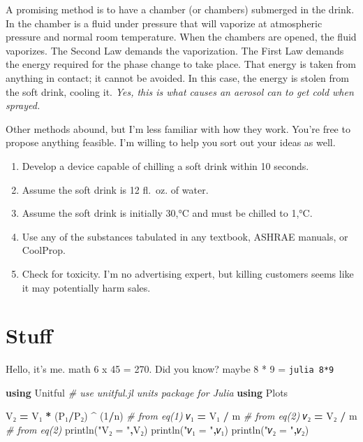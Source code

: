 \documentclass[
]{book}
\newenvironment{Shaded}{\begin{snugshade}}{\end{snugshade}}
\newcommand{\CommentTok}[1]{\textcolor[rgb]{0.56,0.35,0.01}{\textit{#1}}}
\newcommand{\FloatTok}[1]{\textcolor[rgb]{0.00,0.00,0.81}{#1}}
\newcommand{\KeywordTok}[1]{\textcolor[rgb]{0.13,0.29,0.53}{\textbf{#1}}}
\newcommand{\NormalTok}[1]{#1}
\newcommand{\OperatorTok}[1]{\textcolor[rgb]{0.81,0.36,0.00}{\textbf{#1}}}
\newcommand{\StringTok}[1]{\textcolor[rgb]{0.31,0.60,0.02}{#1}}
\providecommand{\tightlist}{%
  \setlength{\itemsep}{0pt}\setlength{\parskip}{0pt}}
\begin{document}
A promising method is to have a chamber (or chambers) submerged in the drink. In the chamber is a fluid under pressure that will vaporize at atmospheric pressure and normal room temperature. When the chambers are opened, the fluid vaporizes. The Second Law demands the vaporization. The First Law demands the energy required for the phase change to take place. That energy is taken from anything in contact; it cannot be avoided. In this case, the energy is stolen from the soft drink, cooling it. \emph{Yes, this is what causes an aerosol can to get cold when sprayed.}

Other methods abound, but I'm less familiar with how they work. You're free to propose anything feasible. I'm willing to help you sort out your ideas as well.

\begin{enumerate}
\def\labelenumi{\arabic{enumi}.}
\tightlist
\item
  Develop a device capable of chilling a soft drink within 10 seconds.
\item
  Assume the soft drink is 12 fl.~oz. of water.\\
\item
  Assume the soft drink is initially 30,°C and must be chilled to 1,°C.
\item
  Use any of the substances tabulated in any textbook, ASHRAE manuals, or CoolProp.
\item
  Check for toxicity. I'm no advertising expert, but killing customers seems like it may potentially harm sales.
\end{enumerate}

\hypertarget{stuff}{%
\chapter{Stuff}\label{stuff}}

Hello, it's me. math 6 x 45 = 270. Did you know? maybe 8 * 9 = \texttt{julia\ 8*9}

\begin{Shaded}
\begin{Highlighting}[numbers=left,,firstnumber=100,]

\KeywordTok{using}\NormalTok{ Unitful      }\CommentTok{\# use unitful.jl units package for Julia}
\KeywordTok{using}\NormalTok{ Plots}

\NormalTok{V₂ }\OperatorTok{=}\NormalTok{ V₁ }\OperatorTok{*}\NormalTok{ (P₁}\OperatorTok{/}\NormalTok{P₂) }\OperatorTok{\^{}}\NormalTok{ (}\FloatTok{1}\OperatorTok{/}\NormalTok{n)    }\CommentTok{\# from eq(1)}
\NormalTok{𝑣₁ }\OperatorTok{=}\NormalTok{ V₁ }\OperatorTok{/}\NormalTok{ m                  }\CommentTok{\# from eq(2)}
\NormalTok{𝑣₂ }\OperatorTok{=}\NormalTok{ V₂ }\OperatorTok{/}\NormalTok{ m                  }\CommentTok{\# from eq(2)}
\NormalTok{println(}\StringTok{"V₂ = "}\OperatorTok{,}\NormalTok{V₂)}
\NormalTok{println(}\StringTok{"𝑣₁ = "}\OperatorTok{,}\NormalTok{𝑣₁)}
\NormalTok{println(}\StringTok{"𝑣₂ = "}\OperatorTok{,}\NormalTok{𝑣₂)}
\end{Highlighting}
\end{Shaded}
\end{document}
